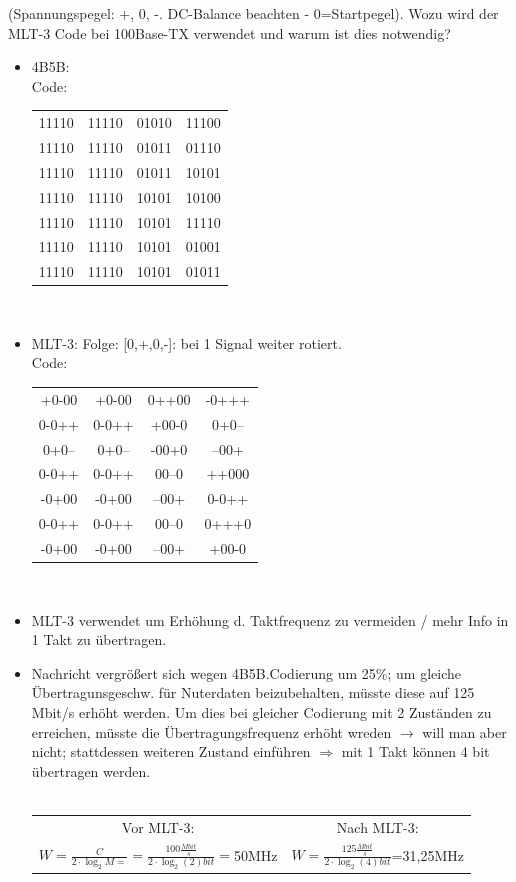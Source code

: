 \documentclass[12pt,a4paper]{report}
\theoremstyle{definition}
\begin{document}
(Spannungspegel: +, 0, -. DC-Balance beachten - 0=Startpegel). Wozu wird der MLT-3 Code bei
100Base-TX verwendet und warum ist dies notwendig?
\\
\begin{itemize}
\item 4B5B:\\
Code:\\
\begin{tabular}{c c c c}
	11110 & 11110 & 01010 & 11100\\
	11110 & 11110 & 01011 & 01110\\
	11110 & 11110 & 01011 & 10101\\
	11110 & 11110 & 10101 & 10100\\
	11110 & 11110 & 10101 & 11110\\
	11110 & 11110 & 10101 & 01001\\
	11110 & 11110 & 10101 & 01011\\
\end{tabular}\\
\item MLT-3: Folge: [0,+,0,-]: bei 1 Signal weiter rotiert.\\
Code:\\
\begin{tabular}{c c c c}
	+0-00 & +0-00 & 0++00 & -0+++\\
	0-0++ & 0-0++ & +00-0 & 0+0--\\
	0+0-- & 0+0-- & -00+0 & --00+\\
	0-0++ & 0-0++ & 00--0 & ++000\\
	-0+00 & -0+00 & --00+ & 0-0++\\
	0-0++ & 0-0++ & 00--0 & 0+++0\\
	-0+00 & -0+00 & --00+ & +00-0\\
\end{tabular}\\
\item MLT-3 verwendet um Erhöhung d. Taktfrequenz zu vermeiden / mehr Info in 1 Takt zu übertragen.
\item Nachricht vergrößert sich wegen 4B5B.Codierung um 25\%; um gleiche Übertragunsgeschw. für Nuterdaten beizubehalten, müsste diese auf 125 Mbit/s erhöht werden. Um dies bei gleicher Codierung mit 2 Zuständen zu erreichen, müsste die Übertragungsfrequenz erhöht wreden $\rightarrow$ will man aber nicht; stattdessen weiteren Zustand einführen $\Rightarrow$ mit 1 Takt können 4 bit übertragen werden.
\\
\\
\begin{tabular}{c | c}
	Vor MLT-3: & Nach MLT-3:\\
	$W=\frac{C}{2\cdot \log_2M=}=\frac{100\frac{Mbit}{s}}{2\cdot \log_2(2)bit}=$50MHz & $W=\frac{125\frac{Mbit}{s}}{2\cdot \log_2(4)bit}$=31,25MHz
\end{tabular}\\
\end{itemize}
\end{document}
